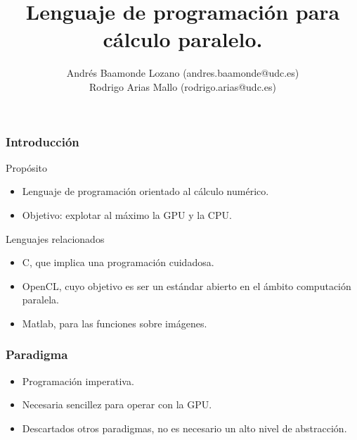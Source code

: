 \documentclass{beamer}
\title{Lenguaje de programación para cálculo paralelo.}
\author{Andrés Baamonde Lozano (andres.baamonde@udc.es)\\
	Rodrigo Arias Mallo (rodrigo.arias@udc.es)}
\begin{document}



\frame{\titlepage}
\begin{frame}
\frametitle{Introducción}
\begin{block}{Propósito}
\begin{itemize}
\item Lenguaje de programación orientado al cálculo numérico.
\item Objetivo: explotar al máximo la GPU y la CPU.
\end{itemize}
\end{block}
\pause
\begin{block}{Lenguajes relacionados}
\begin{itemize}
\item C, que implica una programación cuidadosa.
\item OpenCL, cuyo objetivo es ser un estándar abierto en el ámbito computación paralela.
\item Matlab, para las funciones sobre imágenes.
\end{itemize}
\end{block}
\end{frame}

\begin{frame}
\frametitle{Paradigma}
\begin{itemize}
\item Programación imperativa.
\item Necesaria sencillez para operar con la GPU.
\item Descartados otros paradigmas, no es necesario un alto nivel de abstracción.
\end{itemize}
\end{frame}
\end{document}
